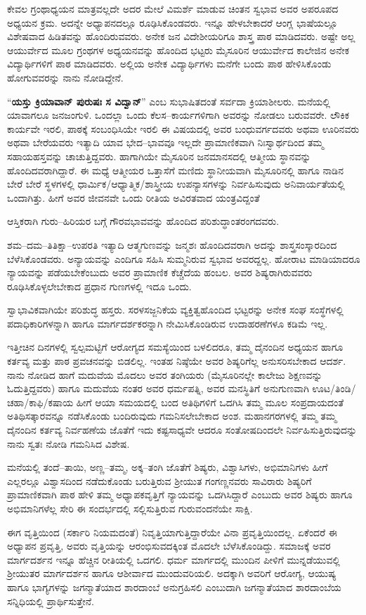 {ಕೇವಲ ಗ್ರಂಥಾಧ್ಯಯನ ಮಾತ್ರವಲ್ಲದೇ ಅದರ ಮೇಲೆ ವಿಮರ್ಶೆ ಮಾಡುವ ಚಿಂತನ ಸ್ವಭಾವ ಅವರ ಅಪರೂಪದ ಅಧ್ಯಯನ ಕ್ರಮ. ಅದನ್ನೇ ಅಧ್ಯಾಪನದಲ್ಲೂ ರೂಢಿಸಿಕೊಂಡವರು. ಇನ್ನೂ ಹೇಳಬೇಕಾದರೆ ಆಂಗ್ಲ ಭಾಷೆಯಲ್ಲೂ ವಿಶೇಷವಾದ ಹಿಡಿತವನ್ನು ಹೊಂದಿರುವವರು. ಅನೇಕ ಜನ ವಿದೇಶೀಯರಿಗೂ ಶಾಸ್ತ್ರ ಪಾಠ ಮಾಡಿದವರು. ಅಷ್ಟೇ ಅಲ್ಲ ಆಯುರ್ವೇದ ಮೂಲ ಗ್ರಂಥಗಳ ಅಧ್ಯಯನವನ್ನು ಹೊಂದಿದ ಭಟ್ಟರು ಮೈಸೂರಿನ ಆಯುರ್ವೇದ ಕಾಲೇಜಿನ ಅನೇಕ ವಿದ್ಯಾರ್ಥಿಗಳಿಗೆ ಪಾಠ ಮಾಡಿದವರು. ಅಲ್ಲಿಯ ಅನೇಕ ವಿದ್ಯಾರ್ಥಿಗಳು ಮನೆಗೇ ಬಂದು ಪಾಠ ಹೇಳಿಸಿಕೊಂಡು ಹೋಗುವವರನ್ನು ನಾನು ನೋಡಿದ್ದೇನೆ.

“\textbf{ಯಸ್ತು ಕ್ರಿಯಾವಾನ್ ಪುರುಷಃ ಸ ವಿದ್ವಾನ್}” ಎಂಬ ಸುಭಾಷಿತದಂತೆ ಸರ್ವದಾ ಕ್ರಿಯಾಶೀಲರು. ಮನೆಯಲ್ಲಿ ಯಾವಾಗಲೂ ಜನಜಂಗುಳಿ. ಒಂದಲ್ಲಾ ಒಂದು ಕೆಲಸ–ಕಾರ್ಯಗಳಿಗಾಗಿ ಅವರನ್ನು ನೋಡಲು ಬರುವವರೇ. ಲೌಕಿಕ ಕಾರ್ಯವೇ ಇರಲಿ, ಪಾಠಕ್ಕೆ ಸಂಬಂಧಿಸಿಯೇ ಇರಲಿ ಈ ವಿಷಯದಲ್ಲಿ ಅವರ ಬಂಧುವರ್ಗದವರು ಅಥವಾ ಊರಿನವರು ಅಥವಾ ಬೇರೆಯವರು ಇತ್ಯಾದಿ ಯಾವ ಭೇದ–ಭಾವವೂ ಇಲ್ಲದೇ ಪ್ರಾಮಾಣಿಕವಾಗಿ ನಿಃಸ್ವಾರ್ಥದಿಂದ ತಮ್ಮ ಸಹಾಯಹಸ್ತವನ್ನು ಚಾಚುತ್ತಿದ್ದವರು. ಹಾಗಾಗಿಯೇ ಮೈಸೂರಿನ ಜನಮಾನಸದಲ್ಲಿ ಆತ್ಮೀಯ ಸ್ಥಾನವನ್ನು ಹೊಂದಿದವರಾಗಿದ್ದಾರೆ. ಈ ಮಧ್ಯೆ ಆತ್ಮೀಯರ ಒತ್ತಾಸೆಗೆ ಮಣಿದು ಸ್ಥಾನೀಯವಾಗಿ ಮೈಸೂರಿನಲ್ಲಿ ಹಾಗೂ ನಾಡಿನ ಬೇರೆ ಬೇರೆ ಸ್ಥಳಗಳಲ್ಲಿ ಧಾರ್ಮಿಕ/ಆಧ್ಯಾತ್ಮಿಕ/ಶಾಸ್ತ್ರೀಯ ಉಪನ್ಯಾಸಗಳನ್ನು ನಿರ್ವಹಿಸುವುದು ಅನಿವಾರ್ಯತೆಯಲ್ಲಿ ಒಂದಾಗಿತ್ತು. ಹೀಗೆ ಅವರ ಜೀವನವೇ ಒಂದು ರೀತಿಯ ಅವಿರತವಾದ ಯಂತ್ರವಿದ್ದಂತೆ

ಆಸ್ತಿಕರಾಗಿ ಗುರು–ಹಿರಿಯರ ಬಗ್ಗೆ ಗೌರವಭಾವವನ್ನು ಹೊಂದಿದ ಪರಿಶುದ್ಧಾಂತರಂಗದವರು. 

ಶಮ–ದಮ–ತಿತಿಕ್ಷಾ–ಉಪರತಿ ಇತ್ಯಾದಿ ಆತ್ಮಗುಣವನ್ನು ಜನ್ಮಶಃ ಹೊಂದಿದವರಾಗಿ ಅದನ್ನು ಶಾಸ್ತ್ರಸಂಸ್ಕಾರದಿಂದ ಬೆಳೆಸಿಕೊಂಡವರು. ಅನ್ಯಾಯವನ್ನು ಎಂದಿಗೂ ಸಹಿಸಿ ಸುಮ್ಮನಿರುವ ಸ್ವಭಾವ ಅವರದ್ದಲ್ಲ. ಹೋರಾಟ ಮಾಡಿಯಾದರೂ ನ್ಯಾಯವನ್ನು ಪಡೆಯಬೇಕೆಂಬುದು ಅವರ ಪ್ರಾಮಾಣಿಕ ಕೆಚ್ಚೆದೆಯ ಹಂಬಲ. ಅವರ ಶಿಷ್ಯರಾಗಿರುವವರು ರೂಢಿಸಿಕೊಳ್ಳಲೇಬೇಕಾದ ಪ್ರಧಾನ ಗುಣಗಳಲ್ಲಿ ಇದೂ ಒಂದು.

ಸ್ವಾಭಾವಿಕವಾಗಿಯೇ ಪರಿಶುದ್ಧ ಹಸ್ತರು. ಸರಳಸಜ್ಜನಿಕೆಯ ವ್ಯಕ್ತಿತ್ವಹೊಂದಿದ ಭಟ್ಟರನ್ನು ಅನೇಕ ಸಂಘ ಸಂಸ್ಥೆಗಳಲ್ಲಿ ಪದಾಧಿಕಾರಿಗಳನ್ನಾಗಿ ಹಾಗೂ ಮಾರ್ಗದರ್ಶಕರನ್ನಾಗಿ ನೇಮಿಸಿಕೊಂಡಿರುವ ಉದಾಹರಣೆಗಳೂ ಕಡಿಮೆ ಇಲ್ಲ.

ಇತ್ತೀಚಿನ ದಿನಗಳಲ್ಲಿ ಸ್ವಲ್ಪಮಟ್ಟಿಗೆ ಆರೋಗ್ಯದ ಸಮಸ್ಯೆಯಿಂದ ಬಳಲಿದರೂ, ತಮ್ಮ ದೈನಂದಿನ ಅಧ್ಯಯನ ಹಾಗೂ ಕರ್ತವ್ಯ ಮತ್ತು ಪಾಠ ಪ್ರವಚನವನ್ನು ಬಿಡಲಿಲ್ಲ. ಇಂತಹ ನಿಷ್ಠೆಯೇ ಅವರ ಶಿಷ್ಯರಿಗೆಲ್ಲ ಅನುಸರಿಸಬೇಕಾದ ಆದರ್ಶ. ನಾನು ನೋಡಿದ ಹಾಗೆ ಮದುವೆಯ ಮೊದಲು ಅವರ ತಂಗಿಯರು (ಮೈಸೂರಿನಲ್ಲೇ ಕಾಲೇಜು ಶಿಕ್ಷಣವನ್ನು ಓದುತ್ತಿದ್ದವರು) ಹಾಗೂ ಮದುವೆಯ ನಂತರ ಅವರ ಧರ್ಮಪತ್ನಿ, ಅವರ ಮನಸ್ಥಿತಿಗೆ ಅನುಗುಣವಾಗಿ ಊಟ/ತಿಂಡಿ/ಚಹಾ/ಕಾಫಿ/ಕಷಾಯ ಹೀಗೆ ಆಯಾ ಸಮಯದಲ್ಲಿ ಬಂದ ಅತಿಥಿಗಳಿಗೆ ಒದಗಿಸಿ ತಮ್ಮ ಮೂಲ ಸಂಪ್ರದಾಯದಂತೆ ಅತಿಥಿಸತ್ಕಾರವನ್ನೂ ನಡೆಸಿಕೊಂಡು ಬಂದಿರುವುದು ಗಮನಿಸಲೇಬೇಕಾದ ಅಂಶ. ಮಹಾನಗರಗಳಲ್ಲಿ ತಮ್ಮ ತಮ್ಮ ದೈನಂದಿನ ಕರ್ತವ್ಯ ನಿರ್ವಹಣೆಯ ಜೊತೆಗೆ ಇದು ಕಷ್ಟಸಾಧ್ಯವೇ ಆದರೂ ಸಂತೋಷದಿಂದಲೇ ನಿರ್ವಹಿಸುತ್ತಿರುವುದನ್ನು ನಾನು ಸ್ವತಃ ನೋಡಿ ಗಮನಿಸಿದ ವಿಶೇಷ.

ಮನೆಯಲ್ಲಿ ತಂದೆ–ತಾಯಿ, ಅಣ್ಣ–ತಮ್ಮ, ಅಕ್ಕ–ತಂಗಿ ಜೊತೆಗೆ ಶಿಷ್ಯರು, ವಿಶ್ವಾಸಿಗಳು, ಅಭಿಮಾನಿಗಳು ಹೀಗೆ ಎಲ್ಲರಲ್ಲೂ ವಿಶ್ವಾಸದಿಂದ ನಡೆದುಕೊಂಡು ಬರುತ್ತಿರುವ ಶ್ರೀಯುತ ಗಂಗಣ್ಣನವರು ಸಾವಿರಾರು ಶಿಷ್ಯರಿಗೆ ಪ್ರಾಮಾಣಿಕವಾಗಿ ಪಾಠ ಹೇಳಿ ತಮ್ಮ ಅಧ್ಯಾಪಕವೃತ್ತಿಗೆ ನ್ಯಾಯವನ್ನು ಒದಗಿಸಿದ್ದಾರೆ ಎಂಬುದು ಅವರ ಶಿಷ್ಯರು ಹಾಗೂ ಅಭಿಮಾನಿಗಳೆಲ್ಲ ಸೇರಿ ಈ ಸಂದರ್ಭದಲ್ಲಿ ಸಲ್ಲಿಸುತ್ತಿರುವ ಗುರುವಂದನೆಯೇ ಸಾಕ್ಷಿ.

ಈಗ ವೃತ್ತಿಯಿಂದ (ಸರ್ಕಾರಿ ನಿಯಮದಂತೆ) ನಿವೃತ್ತಿಯಾಗುತ್ತಿದ್ದಾರೆಯೇ ವಿನಾ ಪ್ರವೃತ್ತಿಯಿಂದಲ್ಲ. ಏಕೆಂದರೆ ಈ ಅಧ್ಯಾಪನ ಪ್ರವೃತ್ತಿ, ಅವರು ವೃತ್ತಿಯನ್ನು ಆರಂಭಿಸುವದಕ್ಕಿಂತ ಮೊದಲೇ ಬೆಳೆಸಿಕೊಂಡಿದ್ದು. ಸಮಾಜಕ್ಕೆ ಅವರ ಮಾರ್ಗದರ್ಶನ ಇನ್ನೂ ಹೆಚ್ಚಿನ ರೀತಿಯಲ್ಲಿ ಒದಗಲಿ. ಧರ್ಮ ಮಾರ್ಗದಲ್ಲಿ ಮುಂದಿನ ಪೀಳಿಗೆ ಮುನ್ನಡೆಯುವಲ್ಲಿ ಶ್ರೀಯುತರ ಮಾರ್ಗದರ್ಶನ ಹಾಗೂ ಆಶೀರ್ವಾದ ಮುಂದುವರಿಯಲಿ. ಅದಕ್ಕಾಗಿ ಅವರಿಗೆ ಆರೋಗ್ಯ, ಆಯುಷ್ಯ ಹಾಗೂ ಭಾಗ್ಯಗಳನ್ನು ಜಗನ್ಮಾತೆಯಾದ ಶಾರದಾಂಬೆ ಅನುಗ್ರಹಿಸಲಿ ಎಂಬುದಾಗಿ ಜಗನ್ಮಾತೆಯಾದ ಶಾರದಾಂಬೆಯ ಸನ್ನಿಧಿಯಲ್ಲಿ ಪ್ರಾರ್ಥಿಸುತ್ತೇನೆ.

\articleend
}
